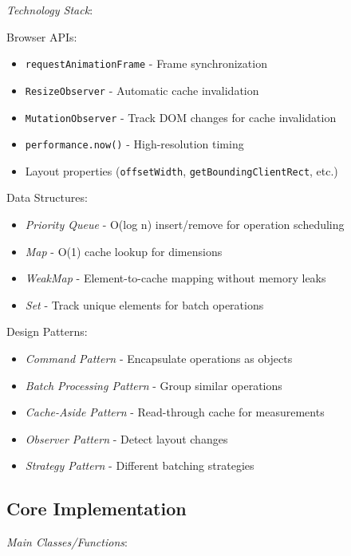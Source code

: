 \documentclass[11pt]{article}
\begin{document}
\emph{Technology Stack}:

Browser APIs:

\begin{itemize}
\item \texttt{requestAnimationFrame} - Frame synchronization
\item \texttt{ResizeObserver} - Automatic cache invalidation
\item \texttt{MutationObserver} - Track DOM changes for cache invalidation
\item \texttt{performance.now()} - High-resolution timing
\item Layout properties (\texttt{offsetWidth}, \texttt{getBoundingClientRect}, etc.)
\end{itemize}

Data Structures:

\begin{itemize}
\item \emph{Priority Queue} - O(log n) insert/remove for operation scheduling
\item \emph{Map} - O(1) cache lookup for dimensions
\item \emph{WeakMap} - Element-to-cache mapping without memory leaks
\item \emph{Set} - Track unique elements for batch operations
\end{itemize}

Design Patterns:

\begin{itemize}
\item \emph{Command Pattern} - Encapsulate operations as objects
\item \emph{Batch Processing Pattern} - Group similar operations
\item \emph{Cache-Aside Pattern} - Read-through cache for measurements
\item \emph{Observer Pattern} - Detect layout changes
\item \emph{Strategy Pattern} - Different batching strategies
\end{itemize}
\subsection{Core Implementation}
\label{sec:org66efc1e}

\emph{Main Classes/Functions}:
\end{document}
